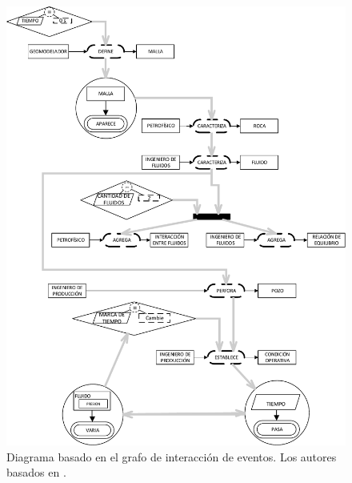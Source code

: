 \begin{figure}[h]
	\centering%
	\includegraphics[width=0.9\linewidth]{Fig/FlujoDeEventos.pdf}%
	\caption[Diagrama basado en el grafo de interacción de eventos.]{Diagrama basado en el grafo de interacción de eventos. Los autores basados en \cite{zapata2013Eventos}.} \label{fig:EventsInteraction}
\end{figure}
